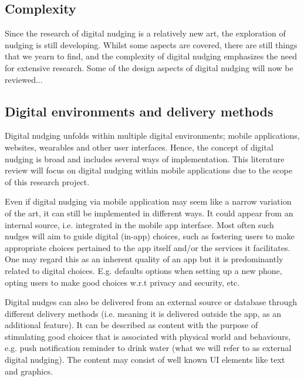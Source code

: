 
\subsection{Complexity}
Since the research of digital nudging is a relatively new art, the exploration of nudging is still developing. Whilst some aspects are covered, there are still things that we yearn to find, and the complexity of digital nudging emphasizes the need for extensive research. Some of the design aspects of digital nudging will now be reviewed...

\subsection{Digital environments and delivery methods}
Digital nudging unfolds within multiple digital environments; mobile applications, websites, wearables and other user interfaces\cite{mirsch_digital_2017}.
Hence, the concept of digital nudging is broad and includes several ways of implementation. This literature review will focus on digital nudging within mobile applications due to the scope of this research project. 

Even if digital nudging via mobile application may seem like a narrow variation of the art, it can still be implemented in different ways. It could appear from an internal source, i.e. integrated in the mobile app interface. Most often such nudges will aim to guide digital (in-app) choices, such as fostering users to make appropriate choices pertained to the app itself and/or the services it facilitates. One may regard this as an inherent quality of an app but it is predominantly related to digital choices. E.g. defaults options when setting up a new phone, opting users to make good choices w.r.t privacy and security, etc.

Digital nudges can also be delivered from an external source or database through different delivery methods (i.e. meaning it is delivered outside the app, as an additional feature). It can be described as content with the purpose of stimulating good choices that is associated with physical world and behaviours, e.g. push notification reminder to drink water (what we will refer to as external digital nudging). The content may consist of well known UI elements like text and graphics. 

